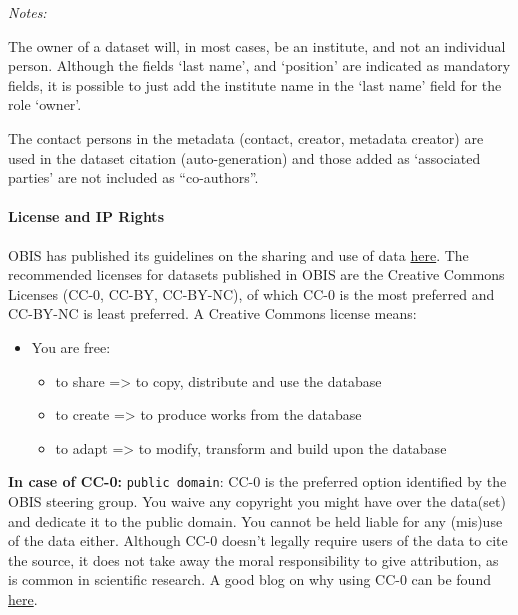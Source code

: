 \documentclass[
  letterpaper,
  DIV=11,
  numbers=noendperiod,
  oneside]{scrreprt}
\let\oldparagraph\paragraph
\renewcommand{\paragraph}[1]{\oldparagraph{#1}\mbox{}}
\providecommand{\tightlist}{%
  \setlength{\itemsep}{0pt}\setlength{\parskip}{0pt}}\usepackage{longtable,booktabs,array}
\begin{document}
\emph{Notes:}

The owner of a dataset will, in most cases, be an institute, and not an
individual person. Although the fields `last name', and `position' are
indicated as mandatory fields, it is possible to just add the institute
name in the `last name' field for the role `owner'.

The contact persons in the metadata (contact, creator, metadata creator)
are used in the dataset citation (auto-generation) and those added as
`associated parties' are not included as ``co-authors''.

\hypertarget{license-and-ip-rights}{%
\paragraph{License and IP Rights}\label{license-and-ip-rights}}

OBIS has published its guidelines on the sharing and use of data
\href{policy.html}{here}. The recommended licenses for datasets
published in OBIS are the Creative Commons Licenses (CC-0, CC-BY,
CC-BY-NC), of which CC-0 is the most preferred and CC-BY-NC is least
preferred. A Creative Commons license means:

\begin{itemize}
\tightlist
\item
  You are free:

  \begin{itemize}
  \tightlist
  \item
    to share =\textgreater{} to copy, distribute and use the database
  \item
    to create =\textgreater{} to produce works from the database
  \item
    to adapt =\textgreater{} to modify, transform and build upon the
    database
  \end{itemize}
\end{itemize}

\textbf{In case of CC-0:} \texttt{public\ domain}: CC-0 is the preferred
option identified by the OBIS steering group. You waive any copyright
you might have over the data(set) and dedicate it to the public domain.
You cannot be held liable for any (mis)use of the data either. Although
CC-0 doesn't legally require users of the data to cite the source, it
does not take away the moral responsibility to give attribution, as is
common in scientific research. A good blog on why using CC-0 can be
found
\href{https://community.canadensys.net/2012/why-we-should-publish-our-data-under-cc0}{here}.
\end{document}
